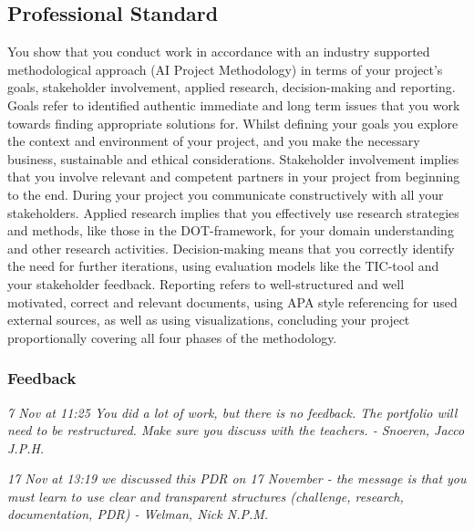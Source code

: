\documentclass[a4paper, 11pt]{article}
\begin{document}
\subsection{Professional Standard}
You show that you conduct work in accordance with an industry supported methodological approach (AI Project Methodology) in terms of your project's goals, stakeholder involvement, applied research, decision-making and reporting.
\medbreak
Goals refer to identified authentic immediate and long term issues that you work towards finding appropriate solutions for. Whilst defining your goals you explore the context and environment of your project, and you make the necessary business, sustainable and ethical considerations. Stakeholder involvement implies that you involve relevant and competent partners in your project from beginning to the end. During your project you communicate constructively with all your stakeholders. Applied research implies that you effectively use research strategies and methods, like those in the DOT-framework, for your domain understanding and other research activities. Decision-making means that you correctly identify the need for further iterations, using evaluation models like the TIC-tool and your stakeholder feedback. Reporting refers to well-structured and well motivated, correct and relevant documents, using APA style referencing for used external sources, as well as using visualizations, concluding your project proportionally covering all four phases of the methodology.  

\subsubsection{Feedback}

\begin{mdframed}[backgroundcolor=gray!20, linecolor=black, linewidth=0pt, leftmargin=1cm, rightmargin=1cm, innertopmargin=10pt, innerbottommargin=10pt]
  \itshape
  7 Nov at 11:25 \smallbreak
  You did a lot of work, but there is no feedback. The portfolio will need to be restructured. Make sure you discuss with the teachers.\smallbreak
- Snoeren, Jacco J.P.H.
\end{mdframed}

\begin{mdframed}[backgroundcolor=gray!20, linecolor=black, linewidth=0pt, leftmargin=1cm, rightmargin=1cm, innertopmargin=10pt, innerbottommargin=10pt]
  \itshape
  17 Nov at 13:19 \smallbreak
  we discussed this PDR on 17 November - the message is that you must learn to use clear and transparent structures (challenge, research, documentation, PDR)\smallbreak
- Welman, Nick N.P.M.
\end{mdframed}
\end{document}
